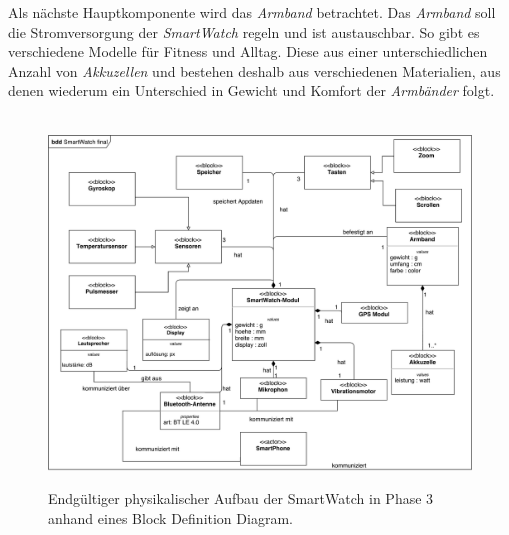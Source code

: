 Als nächste Hauptkomponente wird das \textit{Armband} betrachtet. Das \textit{Armband} soll die Stromversorgung der \textit{SmartWatch} regeln und ist austauschbar. So gibt es verschiedene Modelle für Fitness und Alltag. Diese aus einer unterschiedlichen Anzahl von \textit{Akkuzellen} und bestehen deshalb aus verschiedenen Materialien, aus denen wiederum ein Unterschied in Gewicht und Komfort der \textit{Armbänder} folgt.
\begin{figure}[h]
\centering\
\includegraphics[width=\textwidth]{img/block2}
\caption{Endgültiger physikalischer Aufbau der SmartWatch in Phase 3 anhand eines Block Definition Diagram.}\label{fig:block2}
\end{figure}